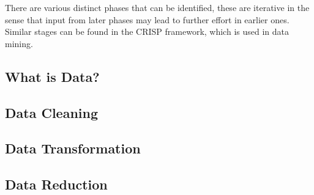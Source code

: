 There are various distinct phases that can be identified, these are iterative in the sense that input from later phases may lead to further effort in earlier ones.
Similar stages can be found in the CRISP framework, which is used in data mining. 

\subsection{What is Data?}

\subsection{Data Cleaning}
\subsection{Data Transformation}
\subsection{Data Reduction}
